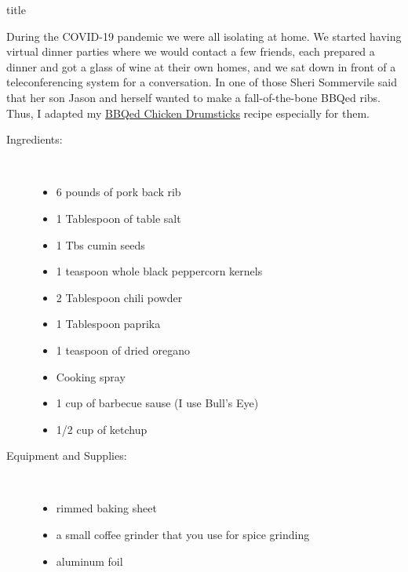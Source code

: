\documentclass [11pt, letterpaper] {article}
\begin{document}
 {title}

During the COVID-19 pandemic we were all isolating at home. We started having virtual dinner parties where we would contact a few friends, each prepared a dinner and got a glass of wine at their own homes, and we sat down in front of a teleconferencing system for a conversation. In one of those Sheri Sommervile said that her son Jason and herself wanted to make a fall-of-the-bone BBQed ribs. Thus, I adapted my \href{BBQedChickenDrumSticks.html}{BBQed Chicken Drumsticks} recipe especially for them.

\begin{description}

\item[Ingredients:]\ \\
	\begin{itemize}
	\item 6 pounds of  pork back rib
	\item 1 Tablespoon of table salt
	\item 1 Tbs cumin seeds
	\item 1 teaspoon whole black peppercorn kernels
	\item 2 Tablespoon chili powder
	\item 1 Tablespoon paprika
        \item 1 teaspoon of dried oregano
	\item Cooking spray
	\item 1 cup of barbecue sause (I use Bull's Eye)
	\item 1/2 cup of ketchup
	\end{itemize}
\item[Equipment and Supplies:]\ \\
	\begin{itemize}
	\item rimmed baking sheet
	\item a small coffee grinder that you use for spice grinding
	\item aluminum foil
	\end{itemize}


\end{description}
\end{document}
